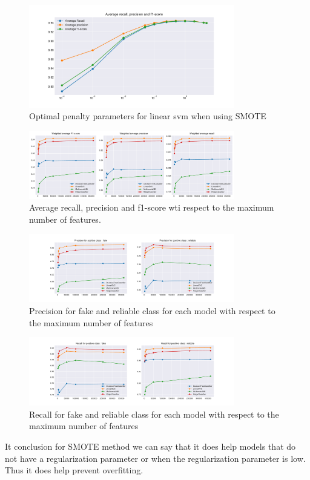 \begin{figure}
 \centering
 \includegraphics[width=0.8\textwidth]{images/chapitre3/svc_fake_smote}
 \caption{Optimal penalty parameters for linear svm when using SMOTE}
 \label{fig:chap3:lsvm3}
\end{figure}

\begin{figure}
 \centering
 \includegraphics[width=0.8\textwidth]{images/chapitre3/ML_SMOTE_fake_average}
 \caption{Average recall, precision and f1-score wti respect to the maximum number of features.}
 \label{fig:chap3:smote_max_feat1}
\end{figure}
\begin{figure}
 \centering
 \includegraphics[width=0.8\textwidth]{images/chapitre3/ML_SMOTE_fake_precision}
 \caption{Precision for fake and reliable class for each model with respect to the maximum number of features}
 \label{fig:chap3:smote_max_feat2}
\end{figure}
\begin{figure}
 \centering
 \includegraphics[width=0.8\textwidth]{images/chapitre3/ML_SMOTE_fake_recall}
 \caption{Recall for fake and reliable class for each model with respect to the maximum number of features}
 \label{fig:chap3:smote_max_feat3}
\end{figure}
It conclusion for SMOTE method we can say that it does help models that do not have a regularization parameter or when the regularization parameter is low. Thus it does help prevent overfitting.
